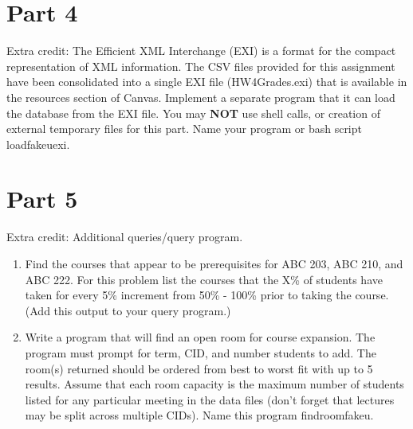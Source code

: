\documentclass{article}
\begin{document}
\section*{Part 4}
Extra credit: The Efficient XML Interchange (EXI) is a format for the compact representation of XML information.
The CSV files provided for this assignment have been consolidated into a single EXI file (HW4Grades.exi) that is available in the resources section of Canvas.
Implement a separate program that it can load the database from the EXI file.
You may {\bf NOT} use shell calls, or creation of external temporary files for this part.
Name your program or bash script loadfakeuexi.
\clearpage

\section*{Part 5}
Extra credit: Additional queries/query program.
\begin{enumerate}[label=\alph*.]
\item Find the courses that appear to be prerequisites for ABC 203, ABC 210, and ABC 222. For this problem list the courses that the X\% of students have taken for every 5\% increment from 50\% - 100\% prior to taking the course. (Add this output to your query program.)\\
 \clearpage
\item Write a program that will find an open room for course expansion. The program must prompt for term, CID, and number students to add. The room(s) returned should be ordered from best to worst fit with up to 5 results. Assume that each room capacity is the maximum number of students listed for any particular meeting in the data files (don't forget that lectures may be split across multiple CIDs). Name this program findroomfakeu.
 \clearpage
\end{enumerate}
\end{document}
